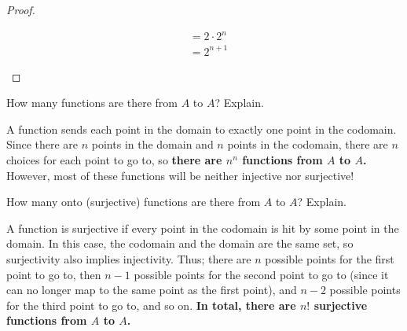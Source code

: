 \begin{problem}
\begin{enumalph}
\begin{answer}
\begin{proof}
\begin{enumroman}
\begin{align*}
                                                &= 2 \cdot 2^n \\
                                                &= 2^{n+1}
              \end{align*}
          \end{enumroman}
        \end{proof}
      \end{answer}
    \item How many functions are there from $A$ to $A$? Explain.
      \begin{answer}
        A function sends each point in the domain to exactly one point in the
        codomain. Since there are $n$ points in the domain
        and $n$ points in the codomain, there are $n$ choices for each point
        to go to, so \textbf{there are $n^n$ functions from $A$ to $A$.}
        However, most of these functions will be neither injective nor surjective!

      \end{answer}
    \item How many onto (surjective) functions are there from $A$ to $A$? Explain.
      \begin{answer}
        A function is surjective if every point in the codomain is hit by
        some point in the domain. In this case, the codomain and the domain
        are the same set, so surjectivity also implies injectivity.
        Thus; there are $n$ possible points for the first point to go to,
        then $n-1$ possible points for the second point to go to
        (since it can no longer map to the same point as the first point),
        and $n-2$ possible points for the third point to go to, and so on.
        \textbf{In total, there are $n!$ surjective functions from $A$ to $A$.}
      \end{answer}
  \end{enumalph}
\end{problem}
